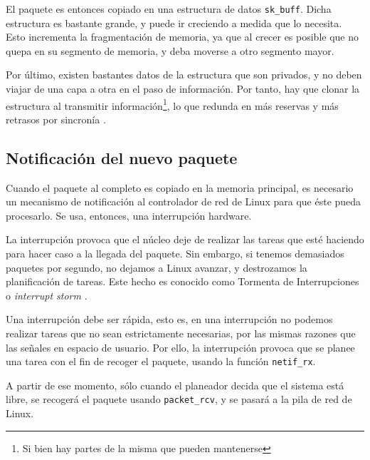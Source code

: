 El paquete es entonces copiado en una estructura de datos \texttt{sk\_buff}. Dicha estructura es bastante grande, y 
puede ir creciendo a medida que lo necesita. Esto incrementa la fragmentación de memoria, ya que al crecer es posible 
que no quepa en su segmento de memoria, y deba moverse a otro segmento mayor.

Por último, existen bastantes datos de la estructura que son privados, y no deben viajar de una capa a otra en el paso 
de información. Por tanto, hay que clonar la estructura al transmitir información\footnote{Si bien hay partes de la 
misma que pueden mantenerse}, lo que redunda en más reservas y más retrasos por sincronía
\cite{skBuffLinuxFoundation}.

\subsection{Notificación del nuevo paquete}
Cuando el paquete al completo es copiado en la memoria principal, es necesario un mecanismo de notificación al 
\gls{controlador} de red de Linux para que éste pueda procesarlo. Se usa, entonces, 
una interrupción hardware.

La interrupción provoca que el núcleo deje de realizar las tareas que esté haciendo para hacer caso a la llegada del 
paquete. Sin embargo, si tenemos demasiados paquetes por segundo, no dejamos a Linux avanzar, y destrozamos la 
planificación de tareas. Este hecho es conocido como Tormenta de Interrupciones o 
\emph{interrupt storm} \cite{p206}.

Una interrupción debe ser rápida, esto es, en una interrupción no podemos realizar tareas que no sean estrictamente 
necesarias, por las mismas razones que las señales en espacio de usuario. Por ello, la interrupción provoca que se 
planee una tarea con el fin de recoger el paquete, usando la función \texttt{netif\_rx}. 

A partir de ese momento, sólo cuando el planeador decida que el sistema está libre, se recogerá el paquete usando 
\texttt{packet\_rcv}, y se pasará a la pila de red de Linux.

